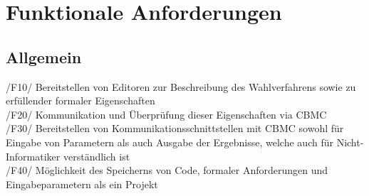 \documentclass[a4paper]{scrreprt}
\begin{document}
\chapter{Funktionale Anforderungen}
\section{Allgemein}
/F10/ Bereitstellen von Editoren zur Beschreibung des Wahlverfahrens sowie zu erfüllender formaler Eigenschaften \\
/F20/ Kommunikation und Überprüfung dieser Eigenschaften via CBMC \\
/F30/ Bereitstellen von Kommunikationsschnittstellen mit CBMC sowohl für Eingabe von Parametern als auch Ausgabe der Ergebnisse, welche auch für Nicht-Informatiker verständlich ist \\
/F40/ Möglichkeit des Speicherns von Code, formaler Anforderungen und Eingabeparametern als ein Projekt \\
\end{document}
